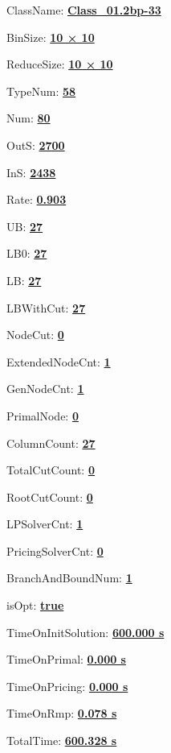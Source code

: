 \documentclass[11pt]{article}
\begin{document}
\pagestyle{empty}


ClassName: \underline{\textbf{Class_01.2bp-33}}
\par
BinSize: \underline{\textbf{10 × 10}}
\par
ReduceSize: \underline{\textbf{10 × 10}}
\par
TypeNum: \underline{\textbf{58}}
\par
Num: \underline{\textbf{80}}
\par
OutS: \underline{\textbf{2700}}
\par
InS: \underline{\textbf{2438}}
\par
Rate: \underline{\textbf{0.903}}
\par
UB: \underline{\textbf{27}}
\par
LB0: \underline{\textbf{27}}
\par
LB: \underline{\textbf{27}}
\par
LBWithCut: \underline{\textbf{27}}
\par
NodeCut: \underline{\textbf{0}}
\par
ExtendedNodeCnt: \underline{\textbf{1}}
\par
GenNodeCnt: \underline{\textbf{1}}
\par
PrimalNode: \underline{\textbf{0}}
\par
ColumnCount: \underline{\textbf{27}}
\par
TotalCutCount: \underline{\textbf{0}}
\par
RootCutCount: \underline{\textbf{0}}
\par
LPSolverCnt: \underline{\textbf{1}}
\par
PricingSolverCnt: \underline{\textbf{0}}
\par
BranchAndBoundNum: \underline{\textbf{1}}
\par
isOpt: \underline{\textbf{true}}
\par
TimeOnInitSolution: \underline{\textbf{600.000 s}}
\par
TimeOnPrimal: \underline{\textbf{0.000 s}}
\par
TimeOnPricing: \underline{\textbf{0.000 s}}
\par
TimeOnRmp: \underline{\textbf{0.078 s}}
\par
TotalTime: \underline{\textbf{600.328 s}}
\par
\newpage


\end{document}
